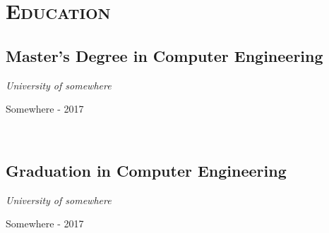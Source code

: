 \section*{\textsc{Education}}

\subsection*{Master's Degree in Computer Engineering}
\emph{University of somewhere}

\small{{\faMapMarker \space Somewhere}               \hfill      {\faCalendar {} - 2017}}

\lipsumsentence[2-4]
\\

\subsection*{Graduation in Computer Engineering}
\emph{University of somewhere}

\small{{\faMapMarker \space Somewhere}               \hfill      {\faCalendar {} - 2017}}

\lipsumsentence[2-4]
